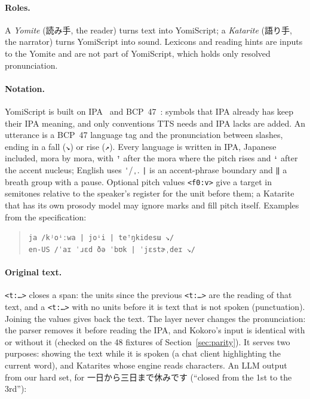 \documentclass[11pt,a4paper]{article}
\newcommand{\ys}[1]{\mbox{\texttt{#1}}}
\begin{document}
\paragraph{Roles.} A \emph{Yomite} (読み手, the reader) turns text into YomiScript; a \emph{Katarite} (語り手, the
narrator) turns YomiScript into sound. Lexicons and reading hints are inputs to the Yomite and are not part of
YomiScript, which holds only resolved pronunciation.

\paragraph{Notation.} YomiScript is built on IPA~\citep{ipa1999handbook} and BCP~47~\citep{rfc5646}: symbols that IPA
already has keep their IPA meaning, and only conventions TTS needs and IPA lacks are added. An utterance is a BCP~47
language tag and the pronunciation between slashes, ending in a fall
(\ys{↘}) or rise (\ys{↗}). Every language is written in IPA, Japanese included, mora by mora, with \ys{ꜛ} after the
mora where the pitch rises and \ys{ꜜ} after the accent nucleus; English uses \ys{ˈ}/\ys{ˌ}. \ys{|} is an accent-phrase
boundary and \ys{‖} a breath group with a pause. Optional pitch values \ys{<f0:v>} give a target in semitones relative
to the speaker's register for the unit before them; a Katarite that has its own prosody model may ignore marks and fill
pitch itself. Examples from the specification:

\begin{quote}
\ys{ja /kʲoꜜːwa | joꜜi | teꜛŋkidesɯ ↘/}\\
\ys{en-US /ˈaɪ ˈɹɛd ðə ˈbʊk | ˈjɛstɚˌdeɪ ↘/}
\end{quote}

\paragraph{Original text.} \ys{<t:…>} closes a span: the units since the previous \ys{<t:…>} are the reading of that
text, and a \ys{<t:…>} with no units before it is text that is not spoken (punctuation). Joining the values gives back
the text. The layer never changes the pronunciation: the parser removes it before reading the IPA, and Kokoro's input
is identical with or without it (checked on the 48 fixtures of Section~\ref{sec:parity}). It serves two purposes:
showing the text while it is spoken (a chat client highlighting the current word), and Katarites whose engine reads
characters. An LLM output from our hard set, for 一日から三日まで休みです (``closed from the 1st to the 3rd''):
\end{document}
